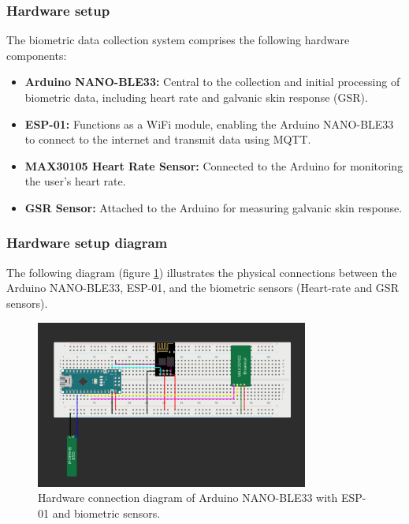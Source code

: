 \subsubsection{Hardware setup}
The biometric data collection system comprises the following hardware components:
\begin{itemize}
    \item \textbf{Arduino NANO-BLE33:} Central to the collection and initial processing of biometric data, including heart rate and galvanic skin response (GSR).
    \item \textbf{ESP-01:} Functions as a WiFi module, enabling the Arduino NANO-BLE33 to connect to the internet and transmit data using MQTT.
    \item \textbf{MAX30105 Heart Rate Sensor:} Connected to the Arduino for monitoring the user's heart rate.
    \item \textbf{GSR Sensor:} Attached to the Arduino for measuring galvanic skin response.
\end{itemize}

\subsubsection{Hardware setup diagram}
The following diagram (figure \ref{fig:hardware-setup}) illustrates the physical connections between the Arduino NANO-BLE33, ESP-01, and the biometric sensors (Heart-rate and GSR sensors).

\begin{figure}[h]
    \centering
    \includegraphics[width=0.8\textwidth]{../images/gsr&heart.png}
    \caption{Hardware connection diagram of Arduino NANO-BLE33 with ESP-01 and biometric sensors.}
    \label{fig:hardware-setup}
\end{figure}


